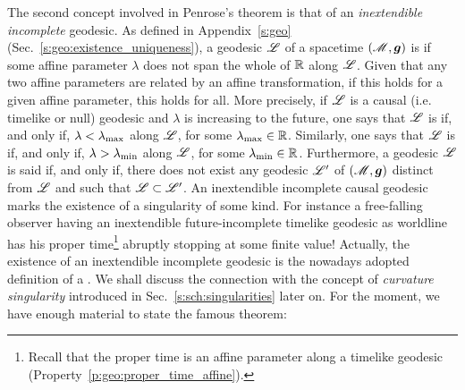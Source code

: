 The second concept involved in Penrose's theorem is that of
an \emph{inextendible incomplete} geodesic. As defined in
Appendix~\ref{s:geo} (Sec.~\ref{s:geo:existence_uniqueness}), a
geodesic $\mathscr{L}$ of a spacetime $(\mathscr{M},\bm{g})$ is  if some affine parameter $\lambda$ does not
span the whole of $\mathbb{R}$ along $\mathscr{L}$.
Given that any two affine parameters are related by
an affine transformation, if this holds for a given affine parameter, this holds for all.
More precisely, if $\mathscr{L}$ is a causal (i.e. timelike or null) geodesic and $\lambda$ is increasing to the future, one says that $\mathscr{L}$
is  if, and only if, $\lambda < \lambda_{\rm max}$
along $\mathscr{L}$, for some $\lambda_{\rm max}\in\mathbb{R}$.
Similarly, one says that $\mathscr{L}$
is  if, and only if,
$\lambda > \lambda_{\rm min}$ along $\mathscr{L}$, for some $\lambda_{\rm min}\in\mathbb{R}$.
Furthermore, a geodesic $\mathscr{L}$ is said  if, and only if,
there does not exist any geodesic $\mathscr{L}'$ of $(\mathscr{M},\bm{g})$ distinct from $\mathscr{L}$
and such that $\mathscr{L}\subset\mathscr{L}'$. An inextendible incomplete causal geodesic
marks the existence of a singularity of some kind.
For instance a free-falling observer having an
inextendible future-incomplete timelike geodesic as worldline has his proper time\footnote{Recall that
the proper time is an affine parameter along a timelike geodesic (Property~\ref{p:geo:proper_time_affine}).} abruptly
stopping at some finite value!
Actually, the existence of an inextendible incomplete geodesic is the
nowadays adopted definition of a . We shall discuss the connection with the concept of \emph{curvature singularity}
introduced in Sec.~\ref{s:sch:singularities} later on.
For the moment, we have enough material
to state the famous theorem:

